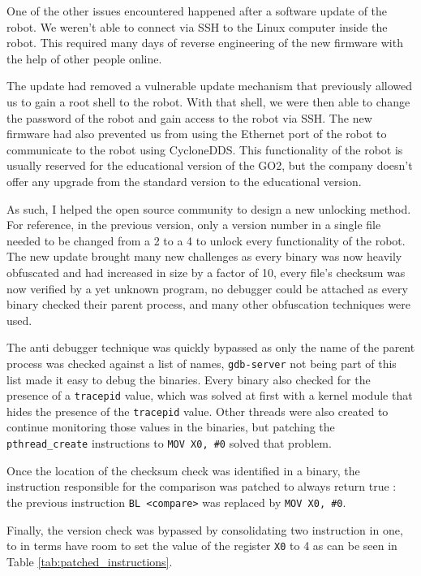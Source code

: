 \documentclass[12pt]{article}
\begin{document}
        One of the other issues encountered happened after a software update of the robot. We weren't able to connect via SSH to the Linux computer inside the robot. This required many days of reverse engineering of the new firmware with the help of other people online.

        The update had removed a vulnerable update mechanism that previously allowed us to gain a root shell to the robot. With that shell, we were then able to change the password of the robot and gain access to the robot via SSH. The new firmware had also prevented us from using the Ethernet port of the robot to communicate to the robot using CycloneDDS. This functionality of the robot is usually reserved for the educational version of the GO2, but the company doesn't offer any upgrade from the standard version to the educational version.

        As such, I helped the open source community to design a new unlocking method. For reference, in the previous version, only a version number in a single file needed to be changed from a 2 to a 4 to unlock every functionality of the robot. The new update brought many new challenges as every binary was now heavily obfuscated and had increased in size by a factor of 10, every file's checksum was now verified by a yet unknown program, no debugger could be attached as every binary checked their parent process, and many other obfuscation techniques were used.

        The anti debugger technique was quickly bypassed as only the name of the parent process was checked against a list of names, \texttt{gdb-server} not being part of this list made it easy to debug the binaries. Every binary also checked for the presence of a \texttt{tracepid} value, which was solved at first with a kernel module that hides the presence of the \texttt{tracepid} value. Other threads were also created to continue monitoring those values in the binaries, but patching the \texttt{pthread\_create} instructions to \texttt{MOV X0, \#0} solved that problem.

        Once the location of the checksum check was identified in a binary, the instruction responsible for the comparison was patched to always return true : the previous instruction \texttt{BL <compare>} was replaced by \texttt{MOV X0, \#0}.

        Finally, the version check was bypassed by consolidating two instruction in one, to in terms have room to set the value of the register \texttt{X0} to 4 as can be seen in Table \ref{tab:patched_instructions}.
        
\end{document}
